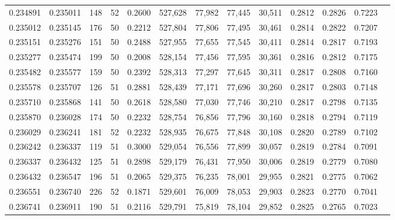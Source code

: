 \begin{tabular}{rrrrrrrrrrrrr}
0.234891 & 0.235011 &   148 &  52 &                                     0.2600 & 527,628 &  77,982 &  77,445 &  30,511 & 0.2812 & 0.2826 & 0.7223 \\
0.235012 & 0.235145 &   176 &  50 &                                     0.2212 & 527,804 &  77,806 &  77,495 &  30,461 & 0.2814 & 0.2822 & 0.7207 \\
0.235151 & 0.235276 &   151 &  50 &                                     0.2488 & 527,955 &  77,655 &  77,545 &  30,411 & 0.2814 & 0.2817 & 0.7193 \\
0.235277 & 0.235474 &   199 &  50 &                                     0.2008 & 528,154 &  77,456 &  77,595 &  30,361 & 0.2816 & 0.2812 & 0.7175 \\
0.235482 & 0.235577 &   159 &  50 &                                     0.2392 & 528,313 &  77,297 &  77,645 &  30,311 & 0.2817 & 0.2808 & 0.7160 \\
0.235578 & 0.235707 &   126 &  51 &                                     0.2881 & 528,439 &  77,171 &  77,696 &  30,260 & 0.2817 & 0.2803 & 0.7148 \\
0.235710 & 0.235868 &   141 &  50 &                                     0.2618 & 528,580 &  77,030 &  77,746 &  30,210 & 0.2817 & 0.2798 & 0.7135 \\
0.235870 & 0.236028 &   174 &  50 &                                     0.2232 & 528,754 &  76,856 &  77,796 &  30,160 & 0.2818 & 0.2794 & 0.7119 \\
0.236029 & 0.236241 &   181 &  52 &                                     0.2232 & 528,935 &  76,675 &  77,848 &  30,108 & 0.2820 & 0.2789 & 0.7102 \\
0.236242 & 0.236337 &   119 &  51 &                                     0.3000 & 529,054 &  76,556 &  77,899 &  30,057 & 0.2819 & 0.2784 & 0.7091 \\
0.236337 & 0.236432 &   125 &  51 &                                     0.2898 & 529,179 &  76,431 &  77,950 &  30,006 & 0.2819 & 0.2779 & 0.7080 \\
0.236432 & 0.236547 &   196 &  51 &                                     0.2065 & 529,375 &  76,235 &  78,001 &  29,955 & 0.2821 & 0.2775 & 0.7062 \\
0.236551 & 0.236740 &   226 &  52 &                                     0.1871 & 529,601 &  76,009 &  78,053 &  29,903 & 0.2823 & 0.2770 & 0.7041 \\
0.236741 & 0.236911 &   190 &  51 &                                     0.2116 & 529,791 &  75,819 &  78,104 &  29,852 & 0.2825 & 0.2765 & 0.7023 \\

\end{tabular}
